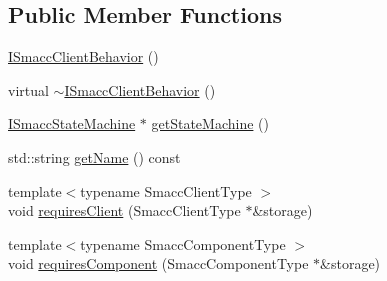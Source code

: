 \subsection*{Public Member Functions}
\begin{DoxyCompactItemize}
\item 
\hyperlink{classsmacc_1_1ISmaccClientBehavior_a12fe603a4b66efe6c190c63da422c7d7}{I\+Smacc\+Client\+Behavior} ()
\item 
virtual \hyperlink{classsmacc_1_1ISmaccClientBehavior_a916a04c467ae5e98c5fc11909f0098f3}{$\sim$\+I\+Smacc\+Client\+Behavior} ()
\item 
\hyperlink{classsmacc_1_1ISmaccStateMachine}{I\+Smacc\+State\+Machine} $\ast$ \hyperlink{classsmacc_1_1ISmaccClientBehavior_a9d55a85bf0a920033805a3c050de2019}{get\+State\+Machine} ()
\item 
std\+::string \hyperlink{classsmacc_1_1ISmaccClientBehavior_a18e4bec9460b010f2894c0f7e7064a34}{get\+Name} () const
\item 
{\footnotesize template$<$typename Smacc\+Client\+Type $>$ }\\void \hyperlink{classsmacc_1_1ISmaccClientBehavior_a32b16e99e3b4cb289414203dc861a440}{requires\+Client} (Smacc\+Client\+Type $\ast$\&storage)
\item 
{\footnotesize template$<$typename Smacc\+Component\+Type $>$ }\\void \hyperlink{classsmacc_1_1ISmaccClientBehavior_a19c6d658c8e809bb93bfdc9b639a3ac3}{requires\+Component} (Smacc\+Component\+Type $\ast$\&storage)
\end{DoxyCompactItemize}
